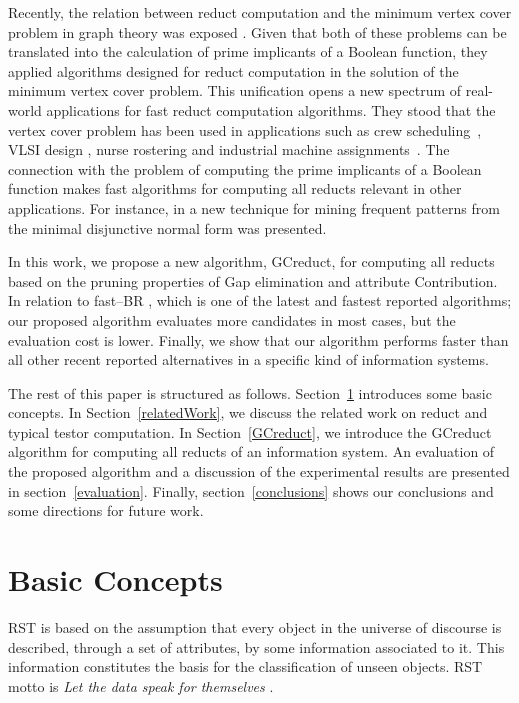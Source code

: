 \documentclass[number,preprint,review,12pt]{elsarticle}
\begin{document}
  Recently, the relation between reduct computation and the minimum vertex cover problem in graph theory was exposed \cite{chen2015}. Given that both of these problems can be translated into the calculation of prime implicants of a Boolean function, they applied algorithms designed for reduct computation in the solution of the minimum vertex cover problem. This unification opens a new spectrum of real-world applications for fast reduct computation algorithms. They stood that the vertex cover problem has been used in applications such as crew scheduling~\citep{Sherali1984}, VLSI design \citep{Bhattacharyya2000}, nurse rostering \citep{Caprara1998} and industrial machine assignments~\citep{Woodyatt1993}. The connection with the problem of computing the prime implicants of a Boolean function makes fast algorithms for computing all reducts relevant in other applications. For instance, in \cite{Li2015} a new technique for mining frequent patterns from the minimal disjunctive normal form was presented.

  In this work, we propose a new algorithm, GCreduct, for computing all reducts based on the pruning properties of Gap elimination and attribute Contribution. 
  In relation to fast--BR \citep{Lias13}, which is one of the latest and fastest reported algorithms; our proposed algorithm evaluates more candidates in most cases, but the evaluation cost is lower. Finally, we show that our algorithm performs faster than all other recent reported alternatives in a specific kind of information systems. 
  
  The rest of this paper is structured as follows. Section~\ref{basicConcepts}  introduces some basic concepts. In Section~\ref{relatedWork}, we discuss the related work on reduct and typical testor computation.  In Section~\ref{GCreduct}, we introduce the GCreduct algorithm for computing all reducts of an information system. An evaluation of the proposed algorithm and a discussion of the experimental results are presented in section~\ref{evaluation}. Finally, section~\ref{conclusions} shows our conclusions and some directions for future work.
   
\section{Basic Concepts}\label{basicConcepts}
  RST is based on the assumption that every object in the universe of discourse is described, through a set of attributes, by some information associated to it. This information constitutes the basis for the classification of unseen objects. RST motto is \textit{Let the data speak for themselves} \citep{Tiwari14}.
\end{document}
